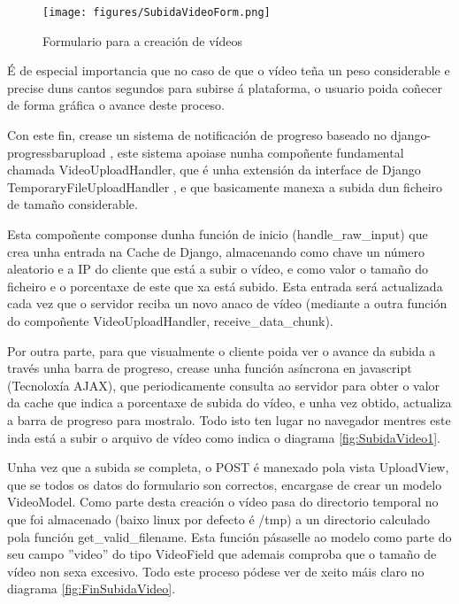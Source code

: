         \begin{figure}[htp]
        \begin{center}
            \texttt{[image: figures/SubidaVideoForm.png]}
            \caption{Formulario para a creación de vídeos}
        \label{fig:SubidaVideoForm}
        \end{center}
        \end{figure}    
        
        É de especial importancia que no caso de que o vídeo teña un peso considerable e precise 
        duns cantos segundos para subirse á plataforma, o usuario poida coñecer de forma gráfica
        o avance deste proceso.
        
        Con este fin, crease un sistema de notificación de progreso baseado no 
        django-progressbarupload \cite{django-progressbarupload}, este sistema apoiase nunha compoñente
        fundamental chamada VideoUploadHandler, que é unha extensión da interface de Django 
        TemporaryFileUploadHandler \cite{TemporaryFileUploadHandler}, e que basicamente manexa a subida
        dun ficheiro de tamaño considerable.
        
        Esta compoñente componse dunha función de inicio (handle\_raw\_input) que crea unha entrada 
        na Cache de Django, almacenando como chave un número aleatorio e a IP do cliente que está a
        subir o vídeo, e como valor o tamaño do ficheiro e o porcentaxe de este que xa está subido.
        Esta entrada será actualizada cada vez que o servidor reciba un novo anaco de vídeo (mediante
        a outra función do compoñente VideoUploadHandler, receive\_data\_chunk). 
        
        Por outra parte, para que visualmente o cliente poida ver o avance da subida a través unha
        barra de progreso, crease unha función asíncrona en javascript (Tecnoloxía AJAX), que 
        periodicamente consulta ao servidor para obter o valor da cache que indica a porcentaxe de
        subida do vídeo, e unha vez obtido, actualiza a barra de progreso para mostralo. Todo isto
        ten lugar no navegador mentres este inda está a subir o arquivo de vídeo como indica o 
        diagrama \ref{fig:SubidaVideo1}.

        Unha vez que a subida se completa, o POST é manexado pola vista UploadView, que se todos
        os datos do formulario son correctos, encargase de crear un modelo VideoModel. Como parte
        desta creación o vídeo pasa do directorio temporal no que foi almacenado (baixo linux por 
        defecto é /tmp) a un directorio calculado pola función get\_valid\_filename. Esta función
        pásaselle ao modelo como parte do seu campo ''video'' do tipo VideoField que ademais 
        comproba que o tamaño de vídeo non sexa excesivo. Todo este proceso
        pódese ver de xeito máis claro no diagrama \ref{fig:FinSubidaVideo}.
        
